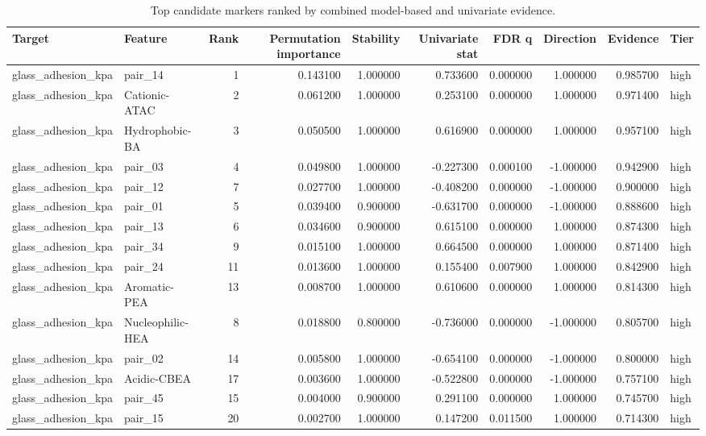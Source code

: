\begin{table}
\caption{Top candidate markers ranked by combined model-based and univariate evidence.}
\label{tab:candidate_markers}
\begin{tabular}{llrrrrrrrl}
\toprule
Target & Feature & Rank & Permutation importance & Stability & Univariate stat & FDR q & Direction & Evidence & Tier \\
\midrule
glass\_adhesion\_kpa & pair\_14 & 1 & 0.143100 & 1.000000 & 0.733600 & 0.000000 & 1.000000 & 0.985700 & high \\
glass\_adhesion\_kpa & Cationic-ATAC & 2 & 0.061200 & 1.000000 & 0.253100 & 0.000000 & 1.000000 & 0.971400 & high \\
glass\_adhesion\_kpa & Hydrophobic-BA & 3 & 0.050500 & 1.000000 & 0.616900 & 0.000000 & 1.000000 & 0.957100 & high \\
glass\_adhesion\_kpa & pair\_03 & 4 & 0.049800 & 1.000000 & -0.227300 & 0.000100 & -1.000000 & 0.942900 & high \\
glass\_adhesion\_kpa & pair\_12 & 7 & 0.027700 & 1.000000 & -0.408200 & 0.000000 & -1.000000 & 0.900000 & high \\
glass\_adhesion\_kpa & pair\_01 & 5 & 0.039400 & 0.900000 & -0.631700 & 0.000000 & -1.000000 & 0.888600 & high \\
glass\_adhesion\_kpa & pair\_13 & 6 & 0.034600 & 0.900000 & 0.615100 & 0.000000 & 1.000000 & 0.874300 & high \\
glass\_adhesion\_kpa & pair\_34 & 9 & 0.015100 & 1.000000 & 0.664500 & 0.000000 & 1.000000 & 0.871400 & high \\
glass\_adhesion\_kpa & pair\_24 & 11 & 0.013600 & 1.000000 & 0.155400 & 0.007900 & 1.000000 & 0.842900 & high \\
glass\_adhesion\_kpa & Aromatic-PEA & 13 & 0.008700 & 1.000000 & 0.610600 & 0.000000 & 1.000000 & 0.814300 & high \\
glass\_adhesion\_kpa & Nucleophilic-HEA & 8 & 0.018800 & 0.800000 & -0.736000 & 0.000000 & -1.000000 & 0.805700 & high \\
glass\_adhesion\_kpa & pair\_02 & 14 & 0.005800 & 1.000000 & -0.654100 & 0.000000 & -1.000000 & 0.800000 & high \\
glass\_adhesion\_kpa & Acidic-CBEA & 17 & 0.003600 & 1.000000 & -0.522800 & 0.000000 & -1.000000 & 0.757100 & high \\
glass\_adhesion\_kpa & pair\_45 & 15 & 0.004000 & 0.900000 & 0.291100 & 0.000000 & 1.000000 & 0.745700 & high \\
glass\_adhesion\_kpa & pair\_15 & 20 & 0.002700 & 1.000000 & 0.147200 & 0.011500 & 1.000000 & 0.714300 & high \\
\bottomrule
\end{tabular}
\end{table}

